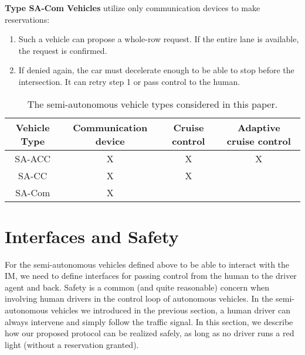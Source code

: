 \noindent
\textbf{Type SA-Com Vehicles} utilize only communication devices
to make reservations:
\begin{enumerate}

\item Such a vehicle can propose a whole-row request.  If the entire
lane is available, the request is confirmed.

\item If denied again, the car must decelerate enough to be able to
stop before the intersection.  It can retry step 1 or pass control to
the human.

\end{enumerate}









\begin{table*}
\centering
\caption{The semi-autonomous vehicle types considered in this paper.}
\label{table:type}
\begin{tabular}{|c|c|c|c|}
  \hline
  Vehicle Type & Communication device & Cruise control & Adaptive cruise control \\
  \hline
  SA-ACC & X & X & X  \\
  \hline
  SA-CC & X & X &  \\
  \hline
  SA-Com & X & &  \\
  \hline
\end{tabular}
\end{table*}


\section{Interfaces and Safety}

For the semi-autonomous vehicles defined above to be able to interact
with the IM, we need to define interfaces for passing control from the
human to the driver agent and back.  Safety is a common (and quite
reasonable) concern when involving human drivers in the control loop
of autonomous vehicles.  In the semi-autonomous vehicles we introduced
in the previous section, a human driver can always intervene and
simply follow the traffic signal. In this section, we describe how our
proposed protocol can be realized safely, as long as no driver runs a
red light (without a reservation granted).


